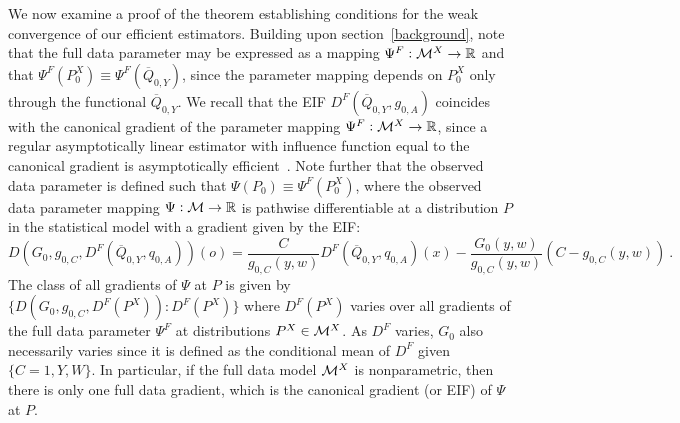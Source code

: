 We now examine a proof of the theorem establishing conditions for the weak
convergence of our efficient estimators. Building upon
section~\ref{background}, note that the full data parameter may be
expressed as a mapping $\Psi^F: \mathcal{M}^X \rightarrow \mathbb{R}$ and that $\Psi^F(P_0^X)
\equiv \Psi^F(\overline{Q}_{0,Y})$, since the parameter mapping depends on
$P_0^X$ only through the functional $\overline{Q}_{0,Y}$. We recall that the EIF
$D^F(\overline{Q}_{0,Y},g_{0,A})$ coincides with the canonical gradient of the
parameter mapping $\Psi^F: \mathcal{M}^X \rightarrow \mathbb{R}$, since a regular asymptotically
linear estimator with influence function equal to the canonical gradient is
asymptotically efficient~\citep{bickel1993efficient, vdl2003unified}. Note
further that the observed data parameter is defined such that $\Psi(P_0) \equiv
\Psi^F(P^X_0)$, where the observed data parameter mapping $\Psi:\mathcal{M} \rightarrow
\mathbb{R}$ is pathwise differentiable at a distribution $P$ in the statistical model
with a gradient given by the EIF:
\begin{equation*}
  D(G_0, g_{0,C}, D^{F}(\overline{Q}_{0,Y}, q_{0,A}))(o) =
  \frac{C}{g_{0,C}(y, w)} D^F(\overline{Q}_{0,Y}, q_{0,A})(x) -
  \frac{G_0(y,w)}{g_{0,C}(y,w)}(C - g_{0,C}(y,w)) \ .
\end{equation*}
The class of all gradients of $\Psi$ at $P$ is given by $\{D(G_0, g_{0,C},
D^F(P^X)): D^F(P^X)\}$ where $D^F(P^X)$ varies over all gradients of the
full data parameter $\Psi^F$ at distributions $P^X \in \mathcal{M}^X$. As $D^F$ varies,
$G_0$ also necessarily varies since it is defined as the conditional mean of
$D^F$ given $\{C = 1, Y, W\}$. In particular, if the full data model $\mathcal{M}^X$ is
nonparametric, then there is only one full data gradient, which is the canonical
gradient (or EIF) of $\Psi$ at $P$.

